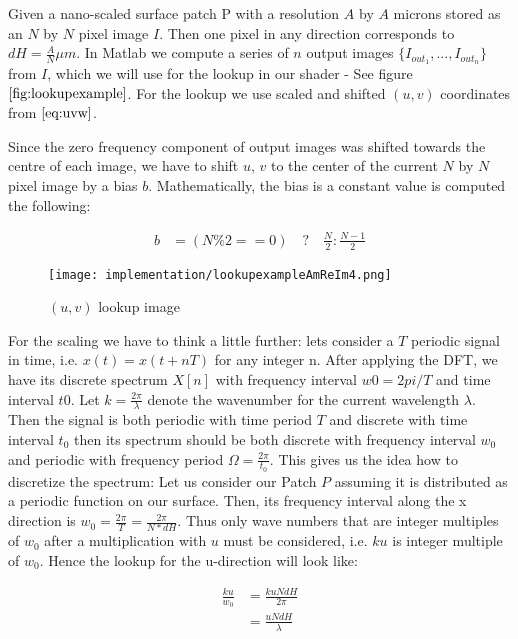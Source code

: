 Given a nano-scaled surface patch P with a resolution $A$ by $A$ microns stored as an $N$ by $N$ pixel image $I$.
Then one pixel in any direction corresponds to $dH = \frac{A}{N} \mu m$. 
In Matlab we compute a series of $n$ output images $\{I_{out_1},...,I_{out_n}\}$ from $I$, which we will use for the lookup in our shader - See figure $\ref{fig:lookupexample}$. For the lookup we use scaled and shifted $(u,v)$ coordinates from $\ref{eq:uvw}$. 

Since the zero frequency component of output images was shifted towards the centre of each image, we have to shift $u$, $v$ to the center of the current $N$ by $N$ pixel image by a bias $b$. Mathematically, the bias is a constant value is computed the following:

\begin{align}
    b
    &= (N \% 2 == 0) \quad ? \quad \frac{N}{2} : \frac{N-1}{2}
\label{eq:bias}
\end{align}

\begin{figure}[H]
  \centering
  \texttt{[image: implementation/lookupexampleAmReIm4.png]}
  \caption[Lookup in DFT Terms]{$(u,v)$ lookup image}
\label{fig:lookupexample}
\end{figure}

For the scaling we have to think a little further: lets consider a $T$ periodic signal in time, i.e. $x(t) = x(t+nT)$ for any integer n. After applying the DFT, we have its discrete spectrum $X[n]$ with frequency interval $w0 = 2pi / T$ and time interval $t0$. Let $k = \frac{2 \pi}{\lambda}$ denote the wavenumber for the current wavelength $\lambda$.
Then the signal is both periodic with time period $T$ and discrete with time interval $t_0$ then its spectrum should be both discrete with frequency interval $w_0$ and periodic with frequency period $\Omega = \frac{2 \pi}{t_0}$. This gives us the idea how to discretize the spectrum: Let us consider our Patch $P$ assuming it is distributed as a periodic function on our surface. Then, its frequency interval along the x direction is $w_0 = \frac{2 \pi}{T} = \frac{2 \pi}{N*dH}$. 
Thus only wave numbers that are integer multiples of $w_0$ after a multiplication with $u$ must be considered, i.e. $ku$ is integer multiple of $w_0$. Hence the lookup for the u-direction will look like:

\begin{align}
    \frac{ku}{w_0} 
    &= \frac{ku N dH}{2 \pi} \\
    &= \frac{u N dH}{\lambda}
\label{eq:scalelook}
\end{align}

